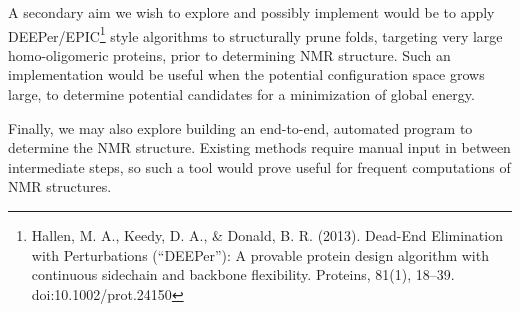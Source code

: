 \documentclass{article}
\begin{document}
A secondary aim we wish to explore and possibly implement would be to apply DEEPer/EPIC\footnote{Hallen, M. A., Keedy, D. A., \& Donald, B. R. (2013). Dead-End Elimination with Perturbations (“DEEPer”): A provable protein design algorithm with continuous sidechain and backbone flexibility. Proteins, 81(1), 18–39. doi:10.1002/prot.24150} style algorithms to structurally prune folds, targeting very large homo-oligomeric proteins, prior to determining NMR structure. Such an implementation would be useful when the potential configuration space grows large, to determine potential candidates for a minimization of global energy. 

Finally, we may also explore building an end-to-end, automated program to determine the NMR structure. Existing methods require manual input in between intermediate steps, so such a tool would prove useful for frequent computations of NMR structures.
\end{document}
